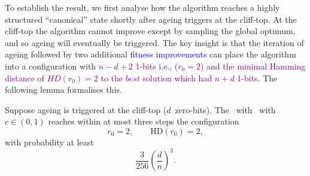To establish the result, we first analyse how the algorithm reaches a highly 
structured ``canonical'' state shortly after ageing triggers at the cliff-top.
At the cliff-top the algorithm cannot improve except by sampling the global 
optimum, and so ageing will eventually be triggered.  The key insight is that 
the iteration of ageing followed by two additional \textcolor{blue}{fitness improvements} can place the 
algorithm into a configuration with \textcolor{purple}{$n-d+2$ 1-bits i.e., ($r_0=2$) and the minimal Hamming distance of $HD(r_0)=2$ to the $best$ solution which had $n+d$ 1-bits.}  The following lemma formalises this.

\begin{lemma}%
	\label{lem:can-start-omega-d3}
	Suppose ageing is triggered at the cliff-top ($d$~zero-bits).  
	The \lastBest~with \linHD\ with $c\in(0,1)$ reaches within at most three steps the 
	configuration
	\[
	r_0=2, \qquad \mathrm{HD}(r_0)=2,
	\]
	with probability at least 
	\[
	\frac{3}{256}\left(\frac{d}{n}\right)^3.
	\]
\end{lemma}

